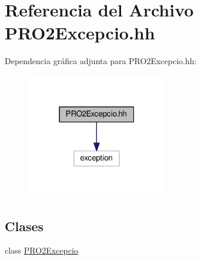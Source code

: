 \hypertarget{_p_r_o2_excepcio_8hh}{}\section{Referencia del Archivo P\+R\+O2\+Excepcio.\+hh}
\label{_p_r_o2_excepcio_8hh}
Dependencia gráfica adjunta para P\+R\+O2\+Excepcio.\+hh\+:\nopagebreak
\begin{figure}[H]
\begin{center}
\leavevmode
\includegraphics[width=175pt]{_p_r_o2_excepcio_8hh__incl}
\end{center}
\end{figure}
\subsection*{Clases}
\begin{DoxyCompactItemize}
\item 
class \hyperlink{class_p_r_o2_excepcio}{P\+R\+O2\+Excepcio}
\end{DoxyCompactItemize}
